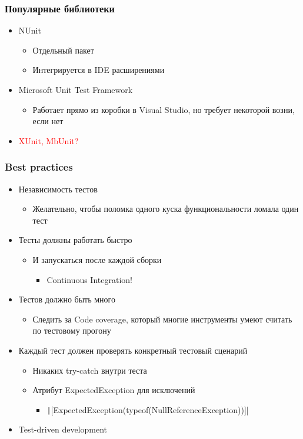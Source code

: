 \documentclass[xetex,mathserif,serif]{beamer}
\begin{document}
	\begin{frame}
		\frametitle{Популярные библиотеки}
		\begin{itemize}
			\item NUnit
			\begin{itemize}
				\item Отдельный пакет
				\item Интегрируется в IDE расширениями
			\end{itemize}
			\item Microsoft Unit Test Framework
			\begin{itemize}
				\item Работает прямо из коробки в Visual Studio, но требует некоторой возни, если нет
			\end{itemize}
			\item \textcolor{red}{XUnit, MbUnit?}
		\end{itemize}
	\end{frame}

	\begin{frame}
		\frametitle{Best practices}
		\begin{itemize}
			\item Независимость тестов
			\begin{itemize}
				\item Желательно, чтобы поломка одного куска функциональности ломала один тест
			\end{itemize}
			\item Тесты должны работать быстро
			\begin{itemize}
				\item И запускаться после каждой сборки
				\begin{itemize}
					\item Continuous Integration!
				\end{itemize}
			\end{itemize}
			\item Тестов должно быть много
			\begin{itemize}
				\item Следить за Code coverage, который многие инструменты умеют считать по тестовому прогону
			\end{itemize}
			\item Каждый тест должен проверять конкретный тестовый сценарий
			\begin{itemize}
				\item Никаких try-catch внутри теста
				\item Атрибут ExpectedException для исключений
				\begin{itemize}
					\item \texttt|[ExpectedException(typeof(NullReferenceException))]|
				\end{itemize}
			\end{itemize}
			\item Test-driven development
		\end{itemize}
	\end{frame}
\end{document}
